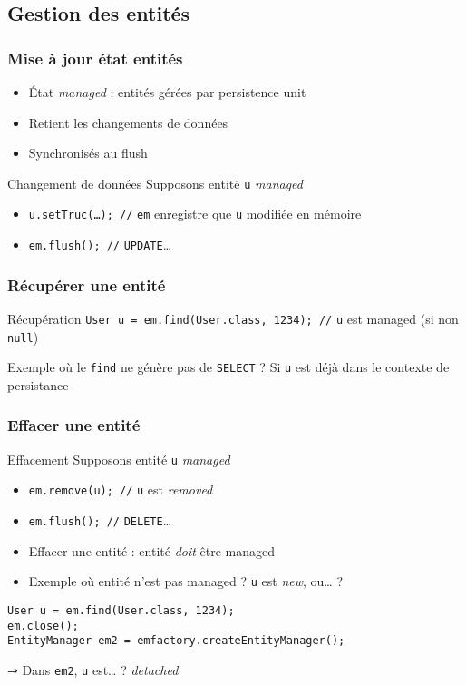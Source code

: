 \documentclass[french, english]{beamer}
\begin{document}
\subsection{Gestion des entités}
\begin{frame}
	\frametitle{Mise à jour état entités}
	\begin{itemize}
		\item État \emph{managed} : entités gérées par persistence unit
		\item Retient les changements de données
		\item Synchronisés au flush
	\end{itemize}
	\begin{exampleblock}{Changement de données}
		Supposons entité \texttt{u} \emph{managed}
		\begin{itemize}
			\item \texttt{u.setTruc(…); //} \texttt{em} enregistre que \texttt{u} modifiée en mémoire
			\item \texttt{em.flush(); //} \texttt{UPDATE}…
		\end{itemize}
	\end{exampleblock}
\end{frame}

\begin{frame}
	\frametitle{Récupérer une entité}
	\begin{exampleblock}{Récupération}
		\texttt{User u = em.find(User.class, 1234); //} \texttt{u} est managed {\tiny (si non \texttt{null})}
	\end{exampleblock}
	Exemple où le \texttt{find} ne génère pas de \texttt{SELECT} ? \pause Si \texttt{u} est déjà dans le contexte de persistance
\end{frame}

\begin{frame}[fragile]
	\frametitle{Effacer une entité}
	\begin{exampleblock}{Effacement}
		Supposons entité \texttt{u} \emph{managed}
		\begin{itemize}
			\item \texttt{em.remove(u); //} \texttt{u} est \emph{removed}
			\item \texttt{em.flush(); //} \texttt{DELETE}…
		\end{itemize}
	\end{exampleblock}
	\begin{itemize}
		\item Effacer une entité : entité \emph{doit} être \og{}managed\fg{}
		\item Exemple où entité n’est pas \og{}managed\fg{} ? \pause \texttt{u} est \emph{new}, ou… ?
	\end{itemize}
	\begin{lstlisting}
User u = em.find(User.class, 1234);
em.close();
EntityManager em2 = emfactory.createEntityManager();
\end{lstlisting}
	⇒ Dans \texttt{em2}, \texttt{u} est… ? \pause \emph{detached} 
\end{frame}
\end{document}
